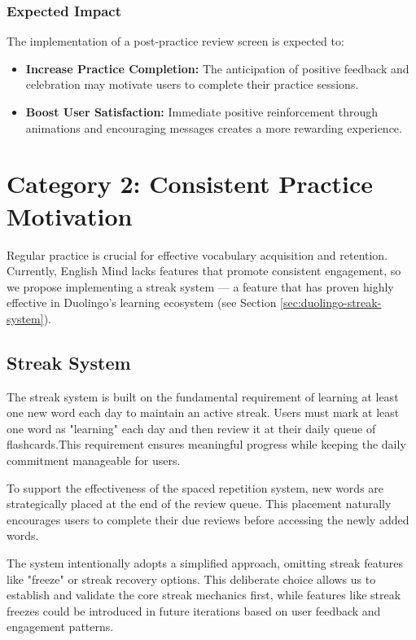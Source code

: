 \subsubsection{Expected Impact}

The implementation of a post-practice review screen is expected to:

\begin{itemize}
    \item \textbf{Increase Practice Completion:} The anticipation of positive feedback and celebration may motivate users to complete their practice sessions.
    
    \item \textbf{Boost User Satisfaction:} Immediate positive reinforcement through animations and encouraging messages creates a more rewarding experience.
\end{itemize}

\newpage

\section{Category 2: Consistent Practice Motivation}
\label{sec:em-gamification-practice-motivation}

Regular practice is crucial for effective vocabulary acquisition and retention. Currently, English Mind lacks features that promote consistent engagement, so we propose implementing a streak system — a feature that has proven highly effective in Duolingo's learning ecosystem (see Section \ref{sec:duolingo-streak-system}).

\subsection{Streak System}

The streak system is built on the fundamental requirement of learning at least one new word each day to maintain an active streak. Users must mark at least one word as "learning" each day and then review it at their daily queue of flashcards.This requirement ensures meaningful progress while keeping the daily commitment manageable for users. 

To support the effectiveness of the spaced repetition system, new words are strategically placed at the end of the review queue. This placement naturally encourages users to complete their due reviews before accessing the newly added words.

The system intentionally adopts a simplified approach, omitting streak features like "freeze" or streak recovery options. This deliberate choice allows us to establish and validate the core streak mechanics first, while features like streak freezes could be introduced in future iterations based on user feedback and engagement patterns.

